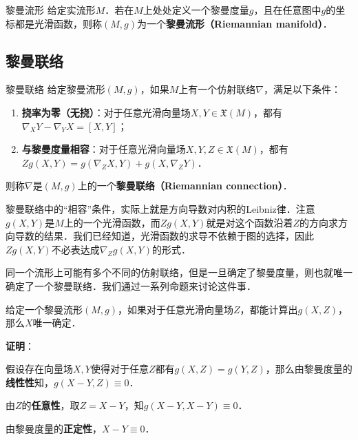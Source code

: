 \begin{definition}{黎曼流形}
给定实流形$M$．若在$M$上处处定义一个黎曼度量$g$，且在任意图中$g$的坐标都是光滑函数，则称$(M, g)$为一个\textbf{黎曼流形（Riemannian manifold）}．
\end{definition}





\subsection{黎曼联络}

\begin{definition}{黎曼联络}
给定黎曼流形$(M, g)$，如果$M$上有一个仿射联络$\nabla$，满足以下条件：
\begin{enumerate}
\item \textbf{挠率为零（无挠）}：对于任意光滑向量场$X, Y\in\mathfrak{X}(M)$，都有$\nabla_XY-\nabla_YX={[X, Y]}$；
\item \textbf{与黎曼度量相容}：对于任意光滑向量场$X, Y, Z\in\mathfrak{X}(M)$，都有$Zg(X, Y)=g(\nabla_ZX, Y)+g(X, \nabla_ZY)$．
\end{enumerate}
则称$\nabla$是$(M, g)$上的一个\textbf{黎曼联络（Riemannian connection）}．
\end{definition}

黎曼联络中的“相容”条件，实际上就是方向导数对内积的Leibniz律．注意$g(X, Y)$是$M$上的一个光滑函数，而$Zg(X, Y)$就是对这个函数沿着$Z$的方向求方向导数的结果．我们已经知道，光滑函数的求导不依赖于图的选择，因此$Zg(X, Y)$不必表达成$\nabla_Zg(X, Y)$的形式．

同一个流形上可能有多个不同的仿射联络，但是一旦确定了黎曼度量，则也就唯一确定了一个黎曼联络．我们通过一系列命题来讨论这件事．







\begin{lemma}{}\label{RieCon_lem1}
给定一个黎曼流形$(M, g)$，如果对于任意光滑向量场$Z$，都能计算出$g(X, Z)$，那么$X$唯一确定．
\end{lemma}

\textbf{证明}：

假设存在向量场$X, Y$使得对于任意$Z$都有$g(X, Z)=g(Y, Z)$，那么由黎曼度量的\textbf{线性性}知，$g(X-Y, Z)\equiv 0$．

由$Z$的\textbf{任意性}，取$Z=X-Y$，知$g(X-Y, X-Y)\equiv 0$．

由黎曼度量的\textbf{正定性}，$X-Y\equiv 0$．

